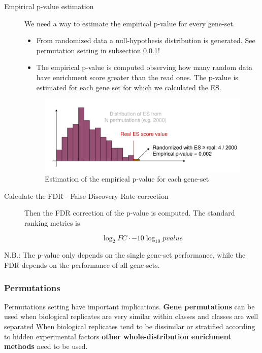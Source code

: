 \begin{description}
		\item[Empirical p-value estimation]
		We need a way to estimate the empirical p-value for every gene-set.
			\begin{itemize}
			\item From randomized data a null-hypothesis distribution is generated. See permutation setting in subsection \ref{subsub:perm}!
			\item The empirical p-value is computed observing how many random data have enrichment score greater than the read ones.
		The p-value is estimated for each gene set for which we calculated the ES.
			\end{itemize}
		
		\begin{figure}[H]
	\centering
	\includegraphics[scale=0.2]{method2}
	\caption{Estimation of the empirical p-value for each gene-set}
	\label{fig:method1}
	\end{figure}
		
		\item[Calculate the FDR - False Discovery Rate correction]
		
			Then the FDR correction of the p-value is computed.
		The standard ranking metrics is:

		$$\log_2 FC\cdot -10\log_{10} pvalue$$
		
		\end{description}
		
		N.B.: The p-value only depends on the single gene-set performance, while the FDR depends on the performance of all gene-sets.

		\subsubsection{Permutations}\label{subsub:perm}
		Permutations setting have important implications.
		\textbf{Gene permutations} can be used when biological replicates are very similar within classes and classes are well separated
		When biological replicates tend to be dissimilar or stratified according to hidden experimental factors \textbf{other whole-distribution enrichment methods} need to be used.

